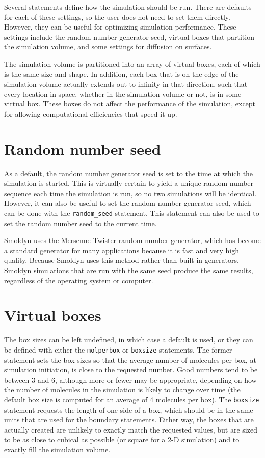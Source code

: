 \documentclass {scrbook}
\newcommand {\ttt} {\texttt}
\begin{document}
Several statements define how the simulation should be run. There are defaults for each of these settings, so the user does not need to set them directly. However, they can be useful for optimizing simulation performance. These settings include the random number generator seed, virtual boxes that partition the simulation volume, and some settings for diffusion on surfaces.

The simulation volume is partitioned into an array of virtual boxes, each of which is the same size and shape. In addition, each box that is on the edge of the simulation volume actually extends out to infinity in that direction, such that every location in space, whether in the simulation volume or not, is in some virtual box. These boxes do not affect the performance of the simulation, except for allowing computational efficiencies that speed it up.

\section{Random number seed}

As a default, the random number generator seed is set to the time at which the simulation is started. This is virtually certain to yield a unique random number sequence each time the simulation is run, so no two simulations will be identical. However, it can also be useful to set the random number generator seed, which can be done with the \ttt{random\_seed} statement. This statement can also be used to set the random number seed to the current time.

Smoldyn uses the Mersenne Twister random number generator, which has become a standard generator for many applications because it is fast and very high quality. Because Smoldyn uses this method rather than built-in generators, Smoldyn simulations that are run with the same seed produce the same results, regardless of the operating system or computer.

\section{Virtual boxes}

The box sizes can be left undefined, in which case a default is used, or they can be defined with either the \ttt{molperbox} or \ttt{boxsize} statements. The former statement sets the box sizes so that the average number of molecules per box, at simulation initiation, is close to the requested number. Good numbers tend to be between 3 and 6, although more or fewer may be appropriate, depending on how the number of molecules in the simulation is likely to change over time (the default box size is computed for an average of 4 molecules per box). The \ttt{boxsize} statement requests the length of one side of a box, which should be in the same units that are used for the boundary statements. Either way, the boxes that are actually created are unlikely to exactly match the requested values, but are sized to be as close to cubical as possible (or square for a 2-D simulation) and to exactly fill the simulation volume.
\end{document}
